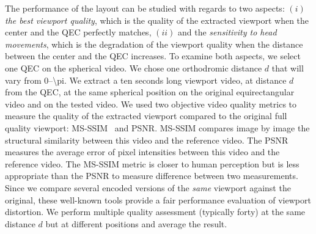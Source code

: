The performance of the layout can be studied with
regards to two aspects: $(i)$ \emph{the best viewport quality}, which
is the quality of the extracted viewport when the \FoV{} center and
the \ac{QEC} perfectly matches, $(ii)$ and the \emph{sensitivity to
head movements}, which is the degradation of the viewport quality when
the distance between the \FoV{} center and the \ac{QEC} increases.
To examine both aspects, we select one \ac{QEC} on the spherical video.
We chose one orthodromic distance $d$ that will vary from \numrange{0}{\pi}.
We extract a ten seconds long viewport video, at distance $d$
from the \ac{QEC}, at the same spherical position on the original
equirectangular video and on the tested video. We used two objective
video quality metrics to measure the quality of the extracted viewport
compared to the original full quality viewport:
\ac{MS-SSIM}~\cite{wang2003multiscale} and
\ac{PSNR}.
\ac{MS-SSIM} compares image by image the structural
similarity between this video and the reference video. The \ac{PSNR} measures the average error of pixel intensities
between this video and the reference video.
The \ac{MS-SSIM} metric is closer to human perception but is less appropriate
than the \ac{PSNR} to measure difference between two measurements.
Since we
compare several encoded versions of the \emph{same} viewport against the
original, these well-known tools provide a fair performance evaluation of viewport distortion.
We perform multiple quality assessment (typically forty) at the same distance $d$ but at different positions and average the result.





